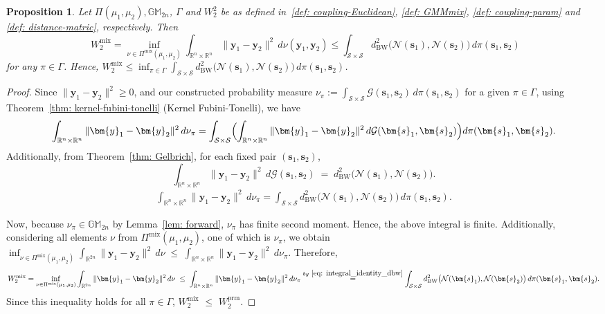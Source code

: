 \documentclass[opre,sglanonrev]{informs4}
\newtheorem{proposition}{Proposition}
\newcommand{\mS}{\mathcal{S}}
\newcommand{\mN}{\mathcal{N}}
\newcommand{\mG}{\mathcal{G}}
\newcommand{\mbR}{\mathbb R}
\newcommand{\mbGM}{\mathbb{GM}}
\newcommand{\bs}{\bm{s}}
\newcommand{\by}{\bm{y}}
\begin{document}
\begin{proposition}\label{thm: R<=L}
 Let $\Pi(\mu_1, \mu_2), \mbGM_{2n}$, $\Gamma$ and $W_2^2$ be as defined  in~\eqref{def: coupling-Euclidean}, \eqref{def: GMMmix}, \eqref{def: coupling-param} and \eqref{def: distance-matric}, respectively. 
 Then 
 $$\,\, W_2^\mathrm{mix} = \inf_{\nu \in \Pi^\mathrm{mix}(\mu_1, \mu_2)} \int_{\mbR^n \times \mbR^n} \|\by_1 - \by_2\|^2 \,d\nu(\by_1,\by_2)  \leq \int_{\mS\times \mS} 
d^2_{\mathrm{BW}}\bigl(\mN(\bs_1),\mN(\bs_2)\bigr)\,d\pi(\bs_1,\bs_2)$$ for any $\pi \in \Gamma$. Hence, $  W_2^\mathrm{mix} \leq \inf_{\pi \in \Gamma} \int_{\mS\times \mS}
          d^2_{\mathrm{BW}}\bigl(\mN(\bs_1),\mN(\bs_2)\bigr)\,d\pi(\bs_1,\bs_2)$.
\end{proposition}

\begin{proof}
Since $\|\by_1 - \by_2\|^2 \ge 0$, and our constructed probability measure $\nu_{\pi}:=\int_{\mS\times \mS}\mG(\bs_1, \bs_2)\,d\pi(\bs_1,\bs_2)$ for a given $\pi \in \Gamma$, using Theorem~\ref{thm: kernel-fubini-tonelli} (Kernel Fubini-Tonelli), we have
\[
  \int_{\mbR^n\times\mbR^n} \|\by_1 - \by_2\|^2\,d\nu_{\pi}
    =
  \int_{\mS\times \mS}
        \Bigl(\int_{\mbR^n\times\mbR^n} \|\by_1 - \by_2\|^2\,
              d\mG(\bs_1, \bs_2)\Bigr)
        d\pi(\bs_1,\bs_2).
\]
Additionally, from Theorem~\ref{thm: Gelbrich}, for each fixed pair $(\bs_1,\bs_2)$,
\[
  \int_{\mbR^n\times\mbR^n} \|\by_1 - \by_2\|^2\,
        d\mG(\bs_1, \bs_2)
    \;=\;
  d^2_{\mathrm{BW}}\bigl(\mN(\bs_1),\mN(\bs_2)\bigr).
\]
\begin{align}\label{eq: integral_identity_dbw}
     \int_{\mbR^n\times\mbR^n} \|\by_1 - \by_2\|^2\,d\nu_{\pi}
     = \int_{\mS\times \mS}
          d^2_{\mathrm{BW}}\bigl(\mN(\bs_1),\mN(\bs_2)\bigr)\,d\pi(\bs_1,\bs_2).
\end{align}

Now, because $\nu_{\pi}\in \mbGM_{2n}$ by Lemma~\ref{lem: forward}, $\nu_{\pi}$ has finite second moment. Hence, the above integral is finite. Additionally,  considering all elements $\nu$ from $\Pi^\mathrm{mix}(\mu_1, \mu_2)$, one of which is $\nu_{\pi}$, we obtain $\inf_{\nu\in \Pi^\mathrm{mix}(\mu_1, \mu_2)}\int_{\mbR^{2n}}\|\by_1 - \by_2\|^2\,d\nu
  \;\le\;
  \int_{\mbR^n\times\mbR^n}
    \|\by_1 - \by_2\|^2\,d\nu_{\pi}$. Therefore,
\[
  W_2^\mathrm{mix}=\inf_{\nu\in \Pi^\mathrm{mix}(\mu_1, \mu_2)}\int_{\mbR^{2n}}\|\by_1 - \by_2\|^2\,d\nu
  \;\le\;
  \int_{\mbR^n\times\mbR^n}
    \|\by_1 - \by_2\|^2\,d\nu_{\pi}
  \stackrel{by~\eqref{eq: integral_identity_dbw}}{\;=\;}
  \int_{\mS\times \mS}d^2_{\mathrm{BW}}\bigl(\mN(\bs_1), \mN(\bs_2)\bigr)\,d\pi(\bs_1, \bs_2).
\]
Since this inequality holds for all $\pi \in \Gamma$,  $ W_2^\mathrm{mix}\,\, \leq \,\, W_2^\mathrm{prm}$.
\end{proof}
\end{document}
